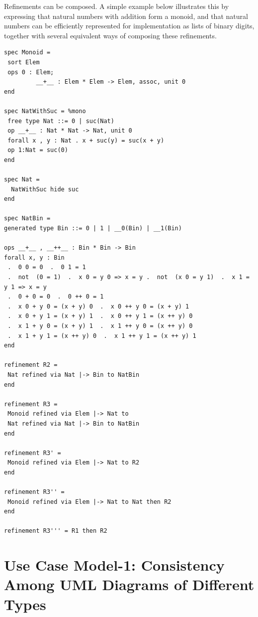 \documentclass[10pt,fleqn,final]{scrreprt}
\newenvironment{definitions}[0]{\medskip }{}
\begin{document}
\begin{definitions}
\medskip

Refinements can be composed. A simple example below illustrates this
by expressing that natural numbers with addition form a monoid, and
that natural numbers can be efficiently represented for implementation
as lists of binary digits, together with several equivalent ways of
composing these refinements.

\begin{lstlisting}[basicstyle=\ttfamily\footnotesize,language=dolText,morekeywords={sort, ops, refinement, free,spec type, assoc, unit,props,op,spec,refined, via,generated, then,ObjectProperty,Class,DisjointUnionOf,SubClassOf,Characteristics,Transitive,Asymmetric,SubPropertyOf,DisjointClasses,EquivalentTo,inverse,only,forall,iff,if,or,exists,distributed,from},escapechar=@,mathescape]	
spec Monoid =
 sort Elem
 ops 0 : Elem;
         __+__ : Elem * Elem -> Elem, assoc, unit 0
end

spec NatWithSuc = %mono
 free type Nat ::= 0 | suc(Nat)
 op __+__ : Nat * Nat -> Nat, unit 0 
 forall x , y : Nat . x + suc(y) = suc(x + y)
 op 1:Nat = suc(0)
end

spec Nat =
  NatWithSuc hide suc
end

spec NatBin =
generated type Bin ::= 0 | 1 | __0(Bin) | __1(Bin)

ops __+__ , __++__ : Bin * Bin -> Bin 
forall x, y : Bin 
 .  0 0 = 0  .  0 1 = 1
 .  not  (0 = 1)  .  x 0 = y 0 => x = y .  not  (x 0 = y 1)  .  x 1 = y 1 => x = y
 .  0 + 0 = 0  .  0 ++ 0 = 1 
 .  x 0 + y 0 = (x + y) 0  .  x 0 ++ y 0 = (x + y) 1
 .  x 0 + y 1 = (x + y) 1  .  x 0 ++ y 1 = (x ++ y) 0 
 .  x 1 + y 0 = (x + y) 1  .  x 1 ++ y 0 = (x ++ y) 0
 .  x 1 + y 1 = (x ++ y) 0  .  x 1 ++ y 1 = (x ++ y) 1 
end

refinement R2 =
 Nat refined via Nat |-> Bin to NatBin
end

refinement R3 =
 Monoid refined via Elem |-> Nat to
 Nat refined via Nat |-> Bin to NatBin
end

refinement R3' =
 Monoid refined via Elem |-> Nat to R2
end

refinement R3'' = 
 Monoid refined via Elem |-> Nat to Nat then R2
end

refinement R3''' = R1 then R2

\end{lstlisting}



\section{Use Case Model-1: Consistency Among UML Diagrams of Different Types}
\label{model-1}


\end{definitions}
\end{document}
